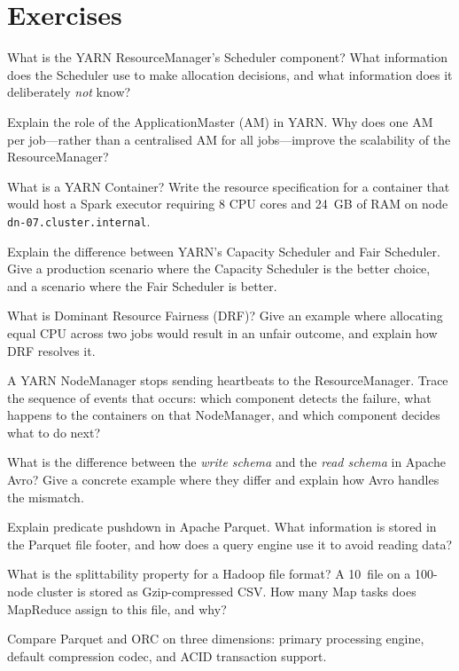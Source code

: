\section*{Exercises}
\label{sec:ch5-exercises}


\sq What is the YARN ResourceManager's Scheduler component? What
information does the Scheduler use to make allocation decisions, and
what information does it deliberately \emph{not} know?

\sq Explain the role of the ApplicationMaster (AM) in YARN. Why does
one AM per job---rather than a centralised AM for all jobs---improve
the scalability of the ResourceManager?

\sq What is a YARN Container? Write the resource specification for a
container that would host a Spark executor requiring 8 CPU cores and
24~GB of RAM on node \texttt{dn-07.cluster.internal}.

\sq Explain the difference between YARN's Capacity Scheduler and Fair
Scheduler. Give a production scenario where the Capacity Scheduler is
the better choice, and a scenario where the Fair Scheduler is better.

\sq What is Dominant Resource Fairness (DRF)? Give an example where
allocating equal CPU across two jobs would result in an unfair outcome,
and explain how DRF resolves it.

\sq A YARN NodeManager stops sending heartbeats to the ResourceManager.
Trace the sequence of events that occurs: which component detects the
failure, what happens to the containers on that NodeManager, and which
component decides what to do next?

\sq What is the difference between the \emph{write schema} and the
\emph{read schema} in Apache Avro? Give a concrete example where they
differ and explain how Avro handles the mismatch.

\sq Explain predicate pushdown in Apache Parquet. What information is
stored in the Parquet file footer, and how does a query engine use it
to avoid reading data?

\sq What is the splittability property for a Hadoop file format? A
10\GB\ file on a 100-node cluster is stored as Gzip-compressed CSV.
How many Map tasks does MapReduce assign to this file, and why?

\sq Compare Parquet and ORC on three dimensions: primary processing
engine, default compression codec, and ACID transaction support.

